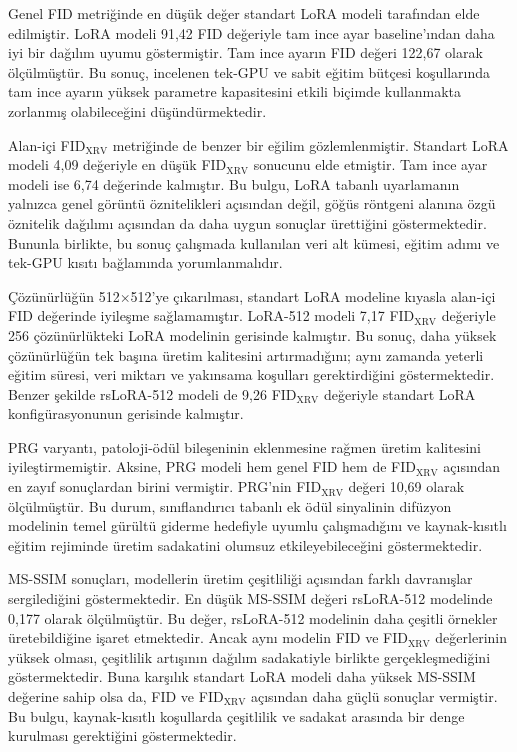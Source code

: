 \documentclass[11pt]{article}
\begin{document}
Genel FID metriğinde en düşük değer standart LoRA modeli tarafından elde
edilmiştir. LoRA modeli 91,42 FID değeriyle tam ince ayar baseline'ından
daha iyi bir dağılım uyumu göstermiştir. Tam ince ayarın FID değeri 122,67
olarak ölçülmüştür. Bu sonuç, incelenen tek-GPU ve sabit eğitim bütçesi
koşullarında tam ince ayarın yüksek parametre kapasitesini etkili biçimde
kullanmakta zorlanmış olabileceğini düşündürmektedir.

Alan-içi FID$_{\text{XRV}}$ metriğinde de benzer bir eğilim gözlemlenmiştir.
Standart LoRA modeli 4,09 değeriyle en düşük FID$_{\text{XRV}}$ sonucunu
elde etmiştir. Tam ince ayar modeli ise 6,74 değerinde kalmıştır. Bu bulgu,
LoRA tabanlı uyarlamanın yalnızca genel görüntü öznitelikleri açısından değil,
göğüs röntgeni alanına özgü öznitelik dağılımı açısından da daha uygun sonuçlar
ürettiğini göstermektedir. Bununla birlikte, bu sonuç çalışmada kullanılan
veri alt kümesi, eğitim adımı ve tek-GPU kısıtı bağlamında yorumlanmalıdır.

Çözünürlüğün 512$\times$512'ye çıkarılması, standart LoRA modeline kıyasla
alan-içi FID değerinde iyileşme sağlamamıştır. LoRA-512 modeli 7,17
FID$_{\text{XRV}}$ değeriyle 256 çözünürlükteki LoRA modelinin gerisinde
kalmıştır. Bu sonuç, daha yüksek çözünürlüğün tek başına üretim kalitesini
artırmadığını; aynı zamanda yeterli eğitim süresi, veri miktarı ve yakınsama
koşulları gerektirdiğini göstermektedir. Benzer şekilde rsLoRA-512 modeli de
9,26 FID$_{\text{XRV}}$ değeriyle standart LoRA konfigürasyonunun gerisinde
kalmıştır.

PRG varyantı, patoloji-ödül bileşeninin eklenmesine rağmen üretim kalitesini
iyileştirmemiştir. Aksine, PRG modeli hem genel FID hem de FID$_{\text{XRV}}$
açısından en zayıf sonuçlardan birini vermiştir. PRG'nin FID$_{\text{XRV}}$
değeri 10,69 olarak ölçülmüştür. Bu durum, sınıflandırıcı tabanlı ek ödül
sinyalinin difüzyon modelinin temel gürültü giderme hedefiyle uyumlu
çalışmadığını ve kaynak-kısıtlı eğitim rejiminde üretim sadakatini olumsuz
etkileyebileceğini göstermektedir.

MS-SSIM sonuçları, modellerin üretim çeşitliliği açısından farklı davranışlar
sergilediğini göstermektedir. En düşük MS-SSIM değeri rsLoRA-512 modelinde
0,177 olarak ölçülmüştür. Bu değer, rsLoRA-512 modelinin daha çeşitli örnekler
üretebildiğine işaret etmektedir. Ancak aynı modelin FID ve
FID$_{\text{XRV}}$ değerlerinin yüksek olması, çeşitlilik artışının dağılım
sadakatiyle birlikte gerçekleşmediğini göstermektedir. Buna karşılık standart
LoRA modeli daha yüksek MS-SSIM değerine sahip olsa da, FID ve
FID$_{\text{XRV}}$ açısından daha güçlü sonuçlar vermiştir. Bu bulgu,
kaynak-kısıtlı koşullarda çeşitlilik ve sadakat arasında bir denge kurulması
gerektiğini göstermektedir.
\end{document}
